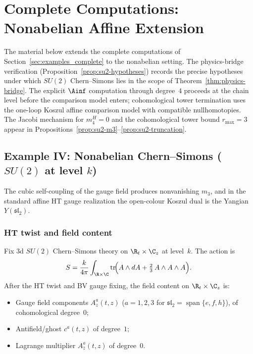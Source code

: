 \section{Complete Computations: Nonabelian Affine Extension}
\label{sec:examples_complete_conditional}

The material below extends the complete computations of
Section~\ref{sec:examples_complete} to the nonabelian setting.
The physics-bridge verification
(Proposition~\ref{prop:su2-hypotheses}) records the precise hypotheses under
which $SU(2)$ Chern--Simons lies in the scope of
Theorem~\ref{thm:physics-bridge}. The explicit
$\Ainf$ computation through degree~$4$ proceeds at the
chain level before the comparison model enters; cohomological tower
termination uses the one-loop Koszul affine comparison model with
compatible nullhomotopies. The Jacobi mechanism for $m_4^H = 0$ and the
cohomological tower bound $r_{\max} = 3$ appear in
Propositions~\ref{prop:su2-m3}--\ref{prop:su2-truncation}.

\subsection{Example IV: Nonabelian Chern--Simons ($SU(2)$ at level $k$)}
\label{ex:nonabelian_CS_complete}

The cubic self-coupling of the gauge field produces nonvanishing
$m_3$, and in the standard affine HT gauge realization the
open-colour Koszul dual is the Yangian $Y(\mathfrak{sl}_2)$.

\subsubsection{HT twist and field content}

Fix 3d $SU(2)$ Chern--Simons theory on $\R_t \times \C_z$
at level~$k$. The action is
\begin{equation}\label{eq:su2-cs-action}
S = \frac{k}{4\pi} \int_{\R \times \C}
 \operatorname{tr}\!\Bigl(
 A \wedge dA + \tfrac{2}{3}\, A \wedge A \wedge A
 \Bigr).
\end{equation}
After the HT twist and BV gauge fixing, the field content on
$\R_t \times \C_z$ is:
\begin{itemize}
\item Gauge field components
 $A_z^a(t,z)$ ($a = 1,2,3$ for
 $\mathfrak{sl}_2 = \operatorname{span}\{e,f,h\}$),
 of cohomological degree~$0$;
\item Antifield/ghost $c^a(t,z)$ of degree~$1$;
\item Lagrange multiplier
 $A_{\bar z}^a(t,z)$ of degree~$0$.
\end{itemize}

